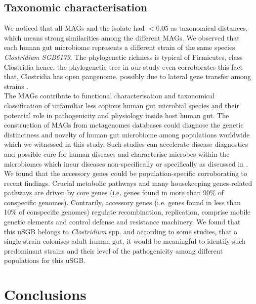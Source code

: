 \documentclass[11pt]{article}
\begin{document}
\subsection{Taxonomic characterisation}
We noticed that all MAGs and the isolate had $<$0.05 as taxonomical distances, which means strong similarities among the different MAGs. We observed that each human gut microbiome represents a different strain of the same species \textit{Clostridium SGB6179}. The phylogenetic richness is typical of Firmicutes, class Clostridia \cite{Forster2019} hence, the phylogenetic tree in our study even corroborates this fact that, Clostridia has open pangenome, possibly due to lateral gene transfer among strains \cite{Qin2012}.\\ 

The MAGs contribute to functional characterisation and taxonomical classification of unfamiliar less copious human gut microbial species and their potential role in pathogenicity and physiology inside host human gut\cite{Jin2022,Almeida2019}. The construction of MAGs from \newline metagenomes databases could diagnose the genetic distinctness and novelty of human gut microbiome among populations worldwide \cite{Nayfach_2019, Asnicar2020} which we witnessed in this study. Such studies can accelerate disease diagnostics and possible cure for human diseases and characterise microbes within the microbiomes which incur diseases non-specifically or specifically as discussed in \cite{Armour2019}. We found that the accessory genes could be population-specific corroborating to recent findings\cite{Almeida2019}. Crucial metabolic pathways and many housekeeping genes-related pathways are driven by core genes (i.e. genes found in more than 90\% of conspecific genomes). Contrarily, accessory genes (i.e. genes found in less than 10\% of conspecific genomes) regulate recombination, replication, comprise mobile genetic elements and  control defense and resistance machinery\cite{Almeida2019}. We found that this uSGB belongs to \textit{Clostridium} spp. and according to some studies\cite{Ferretti2018}, that a single strain colonises adult human gut, it would be meaningful to identify such predominant strains and their level of the pathogenicity among different populations for this uSGB. 

\section{Conclusions}
\end{document}
